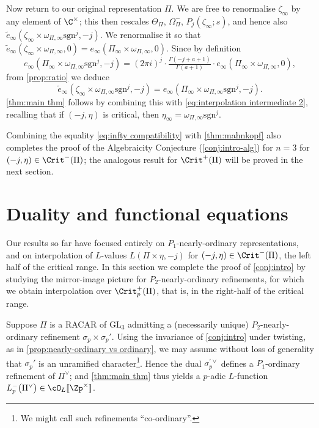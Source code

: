 \documentclass[10pt,reqno,a4paper]{amsart}
\newcommand{\GL}{\mathrm{GL}}
\begin{document}
Now return to our original representation $\Pi$.  We are free to renormalise $\zeta_\infty$ by any element of $\C^\times$; this then rescales $\Theta_\Pi$, $\Omega_\Pi^-$, $P_j(\zeta_\infty;s)$, and hence also $\widetilde{e}_\infty(\zeta_\infty \times \omega_{\Pi,\infty}\mathrm{sgn}^j,-j)$. We renormalise it so that $\widetilde{e}_\infty(\zeta_\infty \times \omega_{\Pi,\infty},0) = e_\infty(\Pi_\infty \times \omega_{\Pi,\infty},0).$ Since by definition 
\[
e_\infty(\Pi_\infty \times \omega_{\Pi,\infty}\mathrm{sgn}^j,-j) = (2\pi i)^{j} \cdot \tfrac{\Gamma(-j+a+1)}{\Gamma(a+1)} \cdot e_\infty(\Pi_\infty \times \omega_{\Pi,\infty},0),
\]
from \cref{prop:ratio} we deduce
\begin{equation}\label{eq:infty compatibility}
\widetilde{e}_\infty(\zeta_\infty \times \omega_{\Pi,\infty}\mathrm{sgn}^j,-j) = e_\infty(\Pi_\infty \times \omega_{\Pi,\infty}\mathrm{sgn}^j,-j).
\end{equation}
\cref{thm:main thm} follows by combining this with \eqref{eq:interpolation intermediate 2}, recalling that if $(-j,\eta)$ is critical, then $\eta_\infty =  \omega_{\Pi,\infty}\mathrm{sgn}^j$.

\begin{remark}
Combining the equality \eqref{eq:infty compatibility} with \cref{thm:mahnkopf} also completes the proof of the Algebraicity Conjecture (\cref{conj:intro-alg}) for $n=3$ for $(-j,\eta) \in \Crit^-(\Pi)$; the analogous result for $\Crit^+(\Pi)$ will be proved in the next section.
\end{remark}










\section{Duality and functional equations}
 \label{sec:functional equation}

 Our results so far have focused entirely on $P_1$-nearly-ordinary representations, and on interpolation of $L$-values $L(\Pi\times \eta,-j)$ for $(-j,\eta) \in \Crit^-(\Pi)$, the left half of the critical range. In this section we complete the proof of \cref{conj:intro} by studying the mirror-image picture for $P_2$-nearly-ordinary refinements, for which we obtain interpolation over $\Crit^+_p(\Pi)$, that is, in the right-half of the critical range.

 Suppose $\Pi$ is a RACAR of $\GL_3$ admitting a (necessarily unique) $P_2$-nearly-ordinary refinement $\sigma_p \times \sigma_p'$. Using the invariance of \cref{conj:intro} under twisting, as in \cref{prop:nearly-ordinary vs ordinary}, we may assume without loss of generality that $\sigma_p'$ is an unramified character\footnote{We might call such refinements ``co-ordinary''.}. Hence the dual $\sigma_p^{\prime\vee}$ defines a $P_1$-ordinary refinement of $\Pi^\vee$; and \cref{thm:main thm} thus yields a $p$-adic $L$-function $L_p^-\big(\Pi^\vee\big) \in \cO_L[\![\Zp^\times]\!]$.
\end{document}
